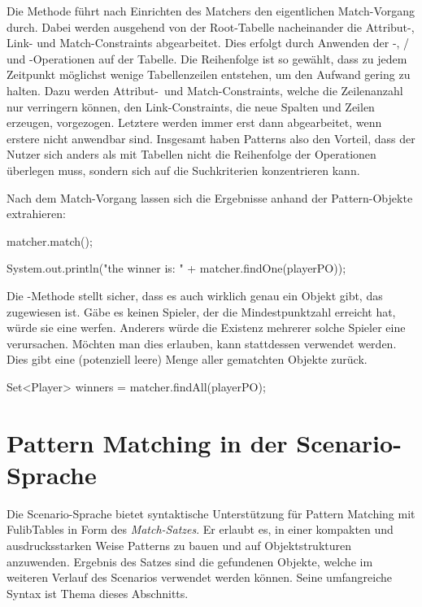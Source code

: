 Die Methode  führt nach Einrichten des Matchers den eigentlichen Match-Vorgang durch.
Dabei werden ausgehend von der Root-Tabelle nacheinander die Attribut-, Link- und Match-Constraints abgearbeitet.
Dies erfolgt durch Anwenden der -, / und -Operationen auf der Tabelle.
Die Reihenfolge ist so gewählt, dass zu jedem Zeitpunkt möglichst wenige Tabellenzeilen entstehen, um den Aufwand gering zu halten.
Dazu werden Attribut-\ und Match-Constraints, welche die Zeilenanzahl nur verringern können, den Link-Constraints, die neue Spalten und Zeilen erzeugen, vorgezogen.
Letztere werden immer erst dann abgearbeitet, wenn erstere nicht anwendbar sind.
Insgesamt haben Patterns also den Vorteil, dass der Nutzer sich anders als mit Tabellen nicht die Reihenfolge der Operationen überlegen muss, sondern sich auf die Suchkriterien konzentrieren kann.

Nach dem Match-Vorgang lassen sich die Ergebnisse anhand der Pattern-Objekte extrahieren:

\begin{jcodeblock}
    matcher.match();

    System.out.println("the winner is: " + matcher.findOne(playerPO));
\end{jcodeblock}

Die -Methode stellt sicher, dass es auch wirklich genau ein Objekt gibt, das  zugewiesen ist.
Gäbe es keinen Spieler, der die Mindestpunktzahl erreicht hat, würde sie eine  werfen.
Anderers würde die Existenz mehrerer solche Spieler eine  verursachen.
Möchten man dies erlauben, kann stattdessen  verwendet werden.
Dies gibt eine (potenziell leere) Menge aller gematchten Objekte zurück.

\begin{jcodeblock}
    Set<Player> winners = matcher.findAll(playerPO);
\end{jcodeblock}

\section{Pattern Matching in der Scenario-Sprache}\label{sec:scenario-pattern-matching}

Die Scenario-Sprache bietet syntaktische Unterstützung für Pattern Matching mit FulibTables in Form des \emph{Match-Satzes}.
Er erlaubt es, in einer kompakten und ausdrucksstarken Weise Patterns zu bauen und auf Objektstrukturen anzuwenden.
Ergebnis des Satzes sind die gefundenen Objekte, welche im weiteren Verlauf des Scenarios verwendet werden können.
Seine umfangreiche Syntax ist Thema dieses Abschnitts.

